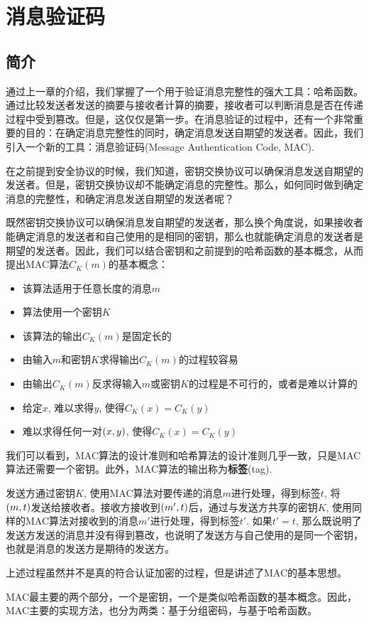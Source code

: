 \chapter{消息验证码}
\section{简介}
通过上一章的介绍，我们掌握了一个用于验证消息完整性的强大工具：哈希函数。通过比较发送者发送的摘要与接收者计算的摘要，接收者可以判断消息是否在传递过程中受到篡改。但是，这仅仅是第一步。在消息验证的过程中，还有一个非常重要的目的：在确定消息完整性的同时，确定消息发送自期望的发送者。因此，我们引入一个新的工具：消息验证码(Message Authentication Code, MAC).\par
在之前提到安全协议的时候，我们知道，密钥交换协议可以确保消息发送自期望的发送者。但是，密钥交换协议却不能确定消息的完整性。那么，如何同时做到确定消息的完整性，和确定消息发送自期望的发送者呢？\par
既然密钥交换协议可以确保消息发自期望的发送者，那么换个角度说，如果接收者能确定消息的发送者和自己使用的是相同的密钥，那么也就能确定消息的发送者是期望的发送者。因此，我们可以结合密钥和之前提到的哈希函数的基本概念，从而提出MAC算法$C_K(m)$的基本概念：
\begin{itemize}
	\item 该算法适用于任意长度的消息$m$
	\item 算法使用一个密钥$K$
	\item 该算法的输出$C_K(m)$是固定长的
	\item 由输入$m$和密钥$K$求得输出$C_K(m)$的过程较容易
	\item 由输出$C_K(m)$反求得输入$m$或密钥$K$的过程是不可行的，或者是难以计算的
	\item 给定$x$, 难以求得$y$, 使得$C_K(x)=C_K(y)$
	\item 难以求得任何一对$\left( {x, y}\right)$, 使得$C_K(x)=C_K(y)$
\end{itemize}

我们可以看到，MAC算法的设计准则和哈希算法的设计准则几乎一致，只是MAC算法还需要一个密钥。此外，MAC算法的输出称为\textbf{标签}(tag).\par
发送方通过密钥$K$, 使用MAC算法对要传递的消息$m$进行处理，得到标签$t$, 将$\left( {m, t}\right)$发送给接收者。接收方接收到$\left( {m', t}\right)$后，通过与发送方共享的密钥$K$, 使用同样的MAC算法对接收到的消息$m'$进行处理，得到标签$t'$. 如果$t'=t$, 那么既说明了发送方发送的消息并没有得到篡改，也说明了发送方与自己使用的是同一个密钥，也就是消息的发送方是期待的发送方。\par
上述过程虽然并不是真的符合认证加密的过程，但是讲述了MAC的基本思想。\par
MAC最主要的两个部分，一个是密钥，一个是类似哈希函数的基本概念。因此，MAC主要的实现方法，也分为两类：基于分组密码，与基于哈希函数。
